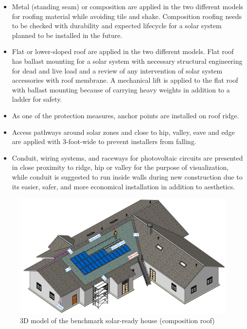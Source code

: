 \documentclass[]{article}
\begin{document}
\begin{itemize}
\item
  Metal (standing seam) or composition are applied in the two different
  models for roofing material while avoiding tile and shake. Composition
  roofing needs to be checked with durability and expected lifecycle for
  a solar system planned to be installed in the future.
\item
  Flat or lower-sloped roof are applied in the two different models.
  Flat roof has ballast mounting for a solar system with necessary
  structural engineering for dead and live load and a review of any
  intervention of solar system accessories with roof membrane. A
  mechanical lift is applied to the flat roof with ballast mounting
  because of carrying heavy weights in addition to a ladder for safety.
\item
  As one of the protection measures, anchor points are installed on roof
  ridge.
\item
  Access pathways around solar zones and close to hip, valley, eave and
  edge are applied with 3-foot-wide to prevent installers from falling.
\item
  Conduit, wiring systems, and raceways for photovoltaic circuits are
  presented in close proximity to ridge, hip or valley for the purpose
  of visualization, while conduit is suggested to run inside walls
  during new construction due to its easier, safer, and more economical
  installation in addition to aesthetics.
\end{itemize}

\begin{figure}
\centering
\includegraphics{3d_2.png}
\caption{3D model of the benchmark solar-ready house (composition roof)}
\end{figure}
\end{document}
